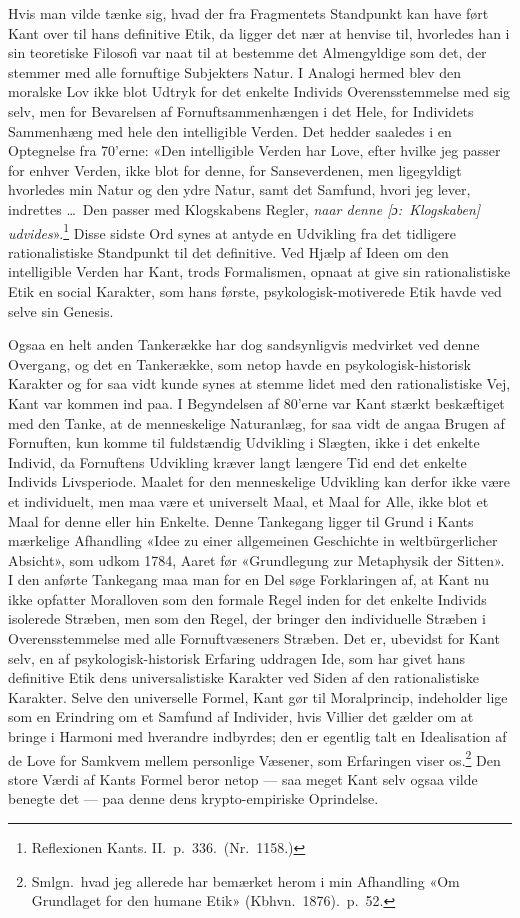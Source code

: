 \documentclass[12pt,a4paper]{article}
\newcommand{\apage}[1]{\marginnote{\footnotesize\textit{[#1]}}}
\begin{document}
Hvis man vilde tænke sig, hvad der fra Fragmentets Standpunkt kan have
ført Kant over til hans definitive Etik, da ligger det nær at henvise
til, hvorledes han i sin teoretiske Filosofi var naat til at bestemme det
Almengyldige som det, der stemmer med alle fornuftige Subjekters Natur. I
Analogi hermed blev den moralske Lov ikke blot Udtryk for det enkelte
Individs Overensstemmelse med sig selv, men for Bevarelsen af
Fornuftsammenhængen i det Hele, for Individets Sammenhæng med hele den
intelligible Verden. Det hedder saaledes i en Optegnelse fra 70'erne:
«Den intelligible Verden har Love, efter hvilke jeg passer for enhver
Verden, ikke blot for denne, for Sanseverdenen, men ligegyldigt hvorledes
min Natur og den ydre Natur, samt det Samfund, hvori jeg lever, indrettes
\ldots\ Den passer med Klogskabens Regler, \emph{naar denne [ɔ:\ Klogskaben]
udvides}».\footnote{Reflexionen Kants. II.\ p.\ 336.\ (Nr.\
1158.)} Disse sidste Ord synes at antyde en Udvikling fra det tidligere
rationalistiske Standpunkt til det definitive. Ved Hjælp af Ideen om den
intelligible Verden har Kant, trods Formalismen, opnaat at give sin
rationalistiske Etik en social Karakter, som hans første,
psykologisk-motiverede Etik havde ved selve sin Genesis.

Ogsaa en helt anden Tankerække har dog sandsynligvis medvirket ved denne
Overgang, og det en Tankerække, som netop havde en psykologisk-historisk
Karakter og for saa vidt kunde synes at stemme lidet med den
rationalistiske Vej, Kant var kommen ind paa. I Begyndelsen af 80'erne
var Kant stærkt beskæftiget med den Tanke, at de menneskelige Naturanlæg,
for saa vidt de angaa Brugen af Fornuften, kun komme til fuldstændig
Udvikling i Slægten, ikke i det enkelte Individ, da Fornuftens Udvikling
kræver langt længere Tid end det enkelte Individs Livsperiode. Maalet for
den menneskelige Udvikling kan derfor ikke være et individuelt, men maa
være et universelt Maal, et Maal for Alle, ikke blot et Maal for denne
eller hin Enkelte. Denne Tankegang ligger til Grund i Kants mærkelige
Afhandling «Idee zu einer allgemeinen Geschichte in weltbürgerlicher
Absicht», som udkom 1784, Aaret før «Grundlegung zur Metaphysik der
Sitten». I den anførte Tankegang maa man for en Del søge Forklaringen af,
at Kant nu ikke opfatter Moralloven som den formale Regel inden for det
enkelte Individs isolerede Stræben, men som den Regel, der bringer den
individuelle Stræben i Overensstemmelse med alle Fornuftvæseners Stræben.
Det er, ubevidst for Kant selv, en af psykologisk-historisk Erfaring
uddragen Ide, som har givet hans definitive Etik dens universalistiske
Karakter ved Siden af den rationalistiske Karakter. Selve den universelle
Formel, Kant gør til Moralprincip, indeholder lige som en Erindring om et
Samfund af Individer, hvis Villier det \apage{45} gælder om at bringe i Harmoni med
hverandre indbyrdes; den er egentlig talt en Idealisation af de Love for
Samkvem mellem personlige Væsener, som Erfaringen viser
os.\footnote{Smlgn.\ hvad jeg allerede har bemærket herom i min Afhandling
«Om Grundlaget for den humane Etik» (Kbhvn.\ 1876).\ p.\ 52.} Den store
Værdi af Kants Formel beror netop --- saa meget Kant selv ogsaa vilde
benegte det --- paa denne dens krypto-empiriske Oprindelse.
\end{document}

